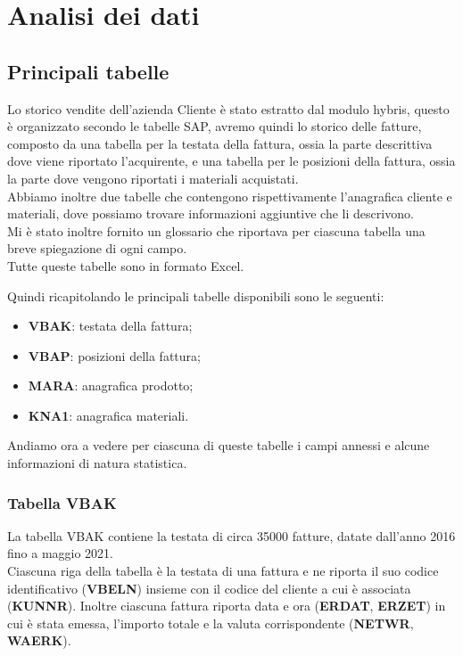 
\hypertarget{(chap:capitolo3)}{}
\chapter{Analisi dei dati}
\section{Principali tabelle}
Lo storico vendite dell'azienda Cliente è stato estratto dal modulo hybris, questo è organizzato secondo le tabelle SAP, avremo quindi lo storico delle fatture, composto da una tabella per la testata della fattura, ossia la parte descrittiva dove viene riportato l'acquirente, e una tabella per le posizioni della fattura, ossia la parte dove vengono riportati i materiali acquistati.\\
Abbiamo inoltre due tabelle che contengono rispettivamente l'anagrafica cliente e materiali, dove possiamo trovare informazioni aggiuntive che li descrivono.\\
Mi è stato inoltre fornito un glossario che riportava per ciascuna tabella una breve spiegazione di ogni campo.\\
Tutte queste tabelle sono in formato Excel.

Quindi ricapitolando le principali tabelle disponibili sono le seguenti:
\begin{itemize}
	\item \textbf{VBAK}: testata della fattura;
	\item \textbf{VBAP}: posizioni della fattura;
	\item \textbf{MARA}: anagrafica prodotto;
	\item \textbf{KNA1}: anagrafica materiali.
\end{itemize}

Andiamo ora a vedere per ciascuna di queste tabelle i campi annessi e alcune informazioni di natura statistica.
\subsection{Tabella VBAK}
La tabella VBAK contiene la testata di circa 35000 fatture, datate dall'anno 2016 fino a maggio 2021.\\
Ciascuna riga della tabella è la testata di una fattura e ne riporta il suo codice identificativo (\textbf{VBELN}) insieme con il codice del cliente a cui è associata (\textbf{KUNNR}). Inoltre ciascuna fattura riporta data e ora (\textbf{ERDAT}, \textbf{ERZET}) in cui è stata emessa, l'importo totale e la valuta corrispondente (\textbf{NETWR}, \textbf{WAERK}).


